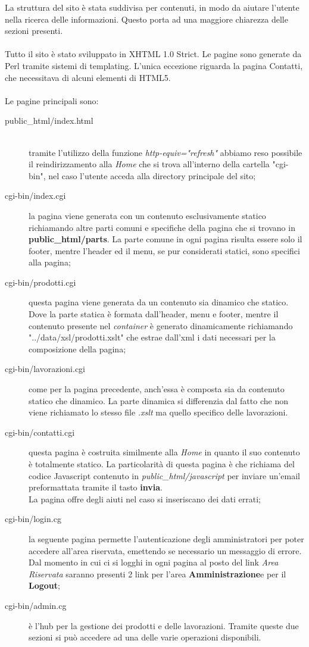 \documentclass[11pt]{article}
\begin{document}
La struttura del sito è stata suddivisa per contenuti, in modo da aiutare l'utente nella ricerca delle informazioni. Questo porta ad una maggiore chiarezza delle sezioni presenti.
\\
\\
Tutto il sito è stato sviluppato in XHTML 1.0 Strict. Le pagine sono generate da Perl tramite sistemi di templating. L'unica eccezione riguarda la pagina Contatti, che necessitava di alcuni elementi di HTML5.
\\
\\Le pagine principali sono:
\\
\begin{description}
	\item[public\_html/index.html] \hfill \\
	 tramite l'utilizzo della funzione \textit{http-equiv="refresh"} abbiamo reso possibile il reindirizzamento alla \textit{Home} che si trova all’interno della cartella "cgi-bin", nel caso l'utente acceda alla directory principale del sito;
	 \item[cgi-bin/index.cgi]  la pagina viene generata con un contenuto esclusivamente statico richiamando altre parti comuni e specifiche della pagina che si trovano in \textbf{public\_html/parts}. La parte comune in ogni pagina risulta essere solo il footer, mentre l'header ed il menu, se pur considerati statici, sono specifici alla pagina;
	 \item[cgi-bin/prodotti.cgi]  questa pagina viene generata da un contenuto sia dinamico che statico. Dove la parte statica è formata dall'header, menu e footer, mentre il contenuto presente nel \textit{container} è generato dinamicamente richiamando "../data/xsl/prodotti.xslt" che estrae dall'xml i dati necessari per la composizione della pagina;
	 \item[cgi-bin/lavorazioni.cgi]  come per la pagina precedente, anch'essa è composta sia da contenuto statico che dinamico. La parte dinamica si differenzia dal fatto che non viene richiamato lo stesso file \textit{.xslt} ma quello specifico delle lavorazioni. 
	 \item[cgi-bin/contatti.cgi] questa pagina è costruita similmente alla \textit{Home} in quanto il suo contenuto è totalmente statico. La particolarità di questa pagina è che richiama del codice Javascript contenuto in \textit{public\_html/javascript} per inviare un'email preformattata tramite il tasto \textbf{invia}.
	 \\La pagina offre degli aiuti nel caso si inseriscano dei dati errati;
	 \item[cgi-bin/login.cg] la seguente pagina permette l'autenticazione degli amministratori per poter accedere all'area riservata, emettendo se necessario un messaggio di errore.
	 \\Dal momento in cui ci si logghi in ogni pagina al posto del link \textit{Area Riservata} saranno presenti 2 link per l'area \textbf{Amministrazione}e per il \textbf{Logout};
	 \item[cgi-bin/admin.cg] è l'hub per la gestione dei prodotti e delle lavorazioni. Tramite queste due sezioni si può accedere ad una delle varie operazioni disponibili.
\end{description}
\newpage
\end{document}
